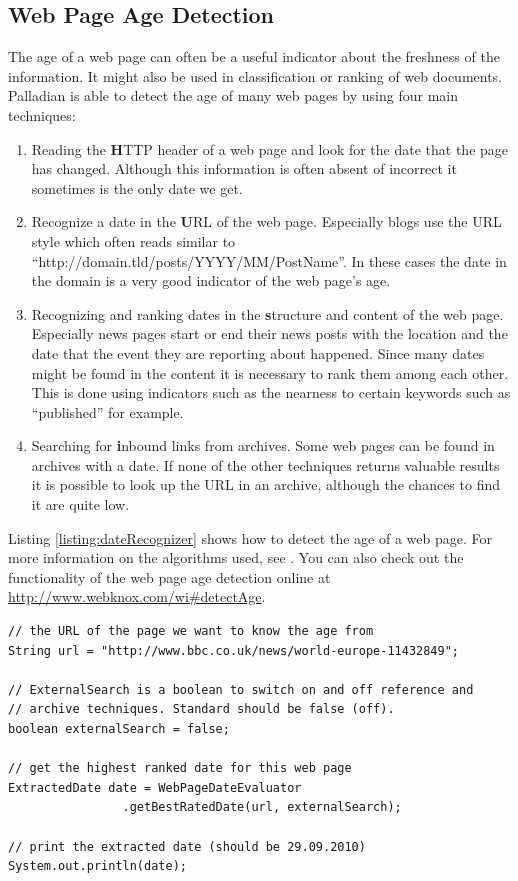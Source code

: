 \documentclass[a4paper,twoside]{book}      %
\begin{document}
\subsection{Web Page Age Detection}
The age of a web page can often be a useful indicator about the freshness of the information. It might also be used in classification or ranking of web documents. Palladian is able to detect the age of many web pages by using four main techniques:
\begin{enumerate}
\item Reading the {\textbf HTTP header} of a web page and look for the date that the page has changed. Although this information is often absent of incorrect it sometimes is the only date we get.
\item Recognize a date in the {\textbf URL} of the web page. Especially blogs use the URL style which often reads similar to ``http://domain.tld/posts/YYYY/MM/PostName''. In these cases the date in the domain is a very good indicator of the web page's age.
\item Recognizing and ranking dates in the {\textbf structure and content} of the web page. Especially news pages start or end their news posts with the location and the date that the event they are reporting about happened. Since many dates might be found in the content it is necessary to rank them among each other. This is done using indicators such as the nearness to certain keywords such as ``published'' for example.
\item Searching for {\textbf inbound links from archives}. Some web pages can be found in archives with a date. If none of the other techniques returns valuable results it is possible to look up the URL in an archive, although the chances to find it are quite low.
\end{enumerate}

Listing \ref{listing:dateRecognizer} shows how to detect the age of a web page. For more information on the algorithms used, see \cite{gregor2010bachelor}. You can also check out the functionality of the web page age detection online at \url{http://www.webknox.com/wi#detectAge}.

\begin{codelisting}
\begin{lstlisting}[label=listing:dateRecognizer,caption=Detecting the age of a web page.,frame=tb]
// the URL of the page we want to know the age from
String url = "http://www.bbc.co.uk/news/world-europe-11432849";

// ExternalSearch is a boolean to switch on and off reference and
// archive techniques. Standard should be false (off).
boolean externalSearch = false;

// get the highest ranked date for this web page
ExtractedDate date = WebPageDateEvaluator
				.getBestRatedDate(url, externalSearch);

// print the extracted date (should be 29.09.2010)
System.out.println(date);
\end{lstlisting}
\end{codelisting}
\end{document}
